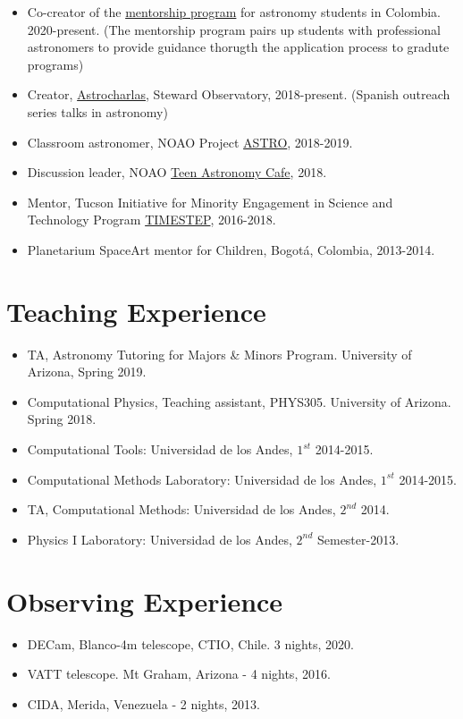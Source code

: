 \documentclass[UTF8]{article}
\begin{document}
\begin{itemize}
  \setlength\itemsep{0.0em}
  \renewcommand\labelitemi{$\cdot$}
\item Co-creator of the \href{https://recastronomia.github.io/mentores/}{mentorship program} for astronomy students in Colombia. 2020-present.
  (The mentorship program pairs up students with professional astronomers to
  provide guidance thorugth the application process to gradute programs)
\item Creator, \href{https://astrocharlas.github.io/}{Astrocharlas},
Steward Observatory, 2018-present.
 (Spanish outreach series talks in astronomy)
\item Classroom astronomer, NOAO Project \href{https://www.noao.edu/education/astro/}{ASTRO}, 2018-2019.
\item Discussion leader, NOAO \href{http://www.teenastronomycafe.org/}{Teen Astronomy Cafe}, 2018.
\item Mentor, Tucson Initiative for Minority Engagement in Science and Technology Program \href{https://lavinia.as.arizona.edu/~timestep/}{TIMESTEP}, 2016-2018.
\item Planetarium SpaceArt mentor for Children, Bogot\'a, Colombia, 2013-2014.
\end{itemize}

\section*{Teaching Experience}
\begin{itemize}
  \setlength\itemsep{0.0em}
  \renewcommand\labelitemi{$\cdot$}
\item TA, Astronomy Tutoring for
Majors \& Minors Program. University of Arizona, Spring 2019. 
\item Computational Physics, Teaching assistant, PHYS305. University of Arizona. Spring 2018.
\item Computational Tools: Universidad de los Andes, $1^{st}$ 2014-2015.
\item Computational Methods Laboratory: Universidad de los Andes, $1^{st}$ 2014-2015.
\item TA, Computational Methods: Universidad de los Andes, $2^{nd}$ 2014.
\item Physics I Laboratory: Universidad de los Andes, $2^{nd}$ Semester-2013.
\end{itemize}

\section*{Observing Experience}
\begin{itemize}
  \setlength\itemsep{0.0em}
  \renewcommand\labelitemi{$\cdot$}
\item DECam, Blanco-4m telescope, CTIO, Chile. 3 nights, 2020.
\item VATT telescope. Mt Graham, Arizona - 4 nights, 2016.
\item CIDA, Merida, Venezuela - 2 nights, 2013.
\end{itemize}
\end{document}
